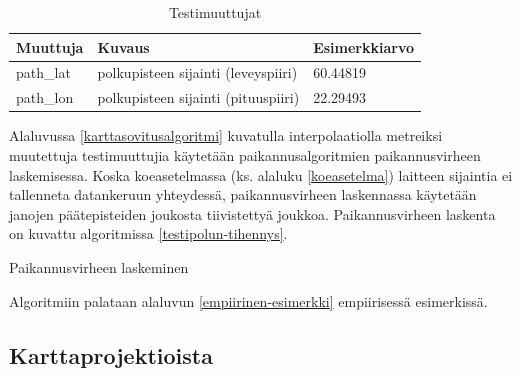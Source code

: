 \documentclass[
  12pt,
  a4paper, twoside]{book}
\begin{document}
\def\arraystretch{1.25} 
\begin{table}[H]
\centering
\begin{tabular}{|l|l|l|}
\hline
Muuttuja & Kuvaus & Esimerkkiarvo\\
\hline
path\_lat & polkupisteen sijainti (leveyspiiri) & 60.44819 \\
path\_lon & polkupisteen sijainti (pituuspiiri) & 22.29493 \\
\hline
\end{tabular}
\caption{Testimuuttujat}
\label{tab:testimuuttujat}
\end{table}

\noindent Alaluvussa \ref{karttasovitusalgoritmi} kuvatulla interpolaatiolla metreiksi muutettuja testimuuttujia käytetään paikannusalgoritmien paikannusvirheen laskemisessa. Koska koeasetelmassa (ks. alaluku \ref{koeasetelma}) laitteen sijaintia ei tallenneta datankeruun yhteydessä, paikannusvirheen laskennassa käytetään janojen päätepisteiden joukosta tiivistettyä joukkoa. Paikannusvirheen laskenta on kuvattu algoritmissa \ref{testipolun-tihennys}.

\begin{algorithm}[H]
\label{testipolun-tihennys}
\DontPrintSemicolon
\SetAlgoShortEnd
{}
\caption{Paikannusvirheen laskeminen}
\end{algorithm}

\noindent Algoritmiin palataan alaluvun \ref{empiirinen-esimerkki} empiirisessä esimerkissä.

\subsection{Karttaprojektioista} \label{karttaprojektioista}
\end{document}
